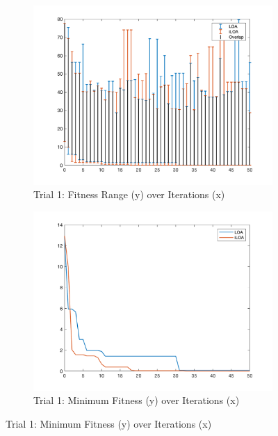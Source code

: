 \begin{figure}
  \centering
  \begin{subfigure}[b]{0.4\textwidth}
    \includegraphics[width=\textwidth]{img/bars/f4/1}
    \caption{ \scriptsize Trial 1: Fitness Range (y) over Iterations (x)}
    \label{fig:f4-b-1}
  \end{subfigure}
  \begin{subfigure}[b]{0.4\textwidth}
    \includegraphics[width=\textwidth]{img/fits/f4/1}
    \caption{ \scriptsize Trial 1: Minimum Fitness (y) over Iterations (x)}
    \label{fig:f4-f-1}
  \end{subfigure}


\end{figure}
